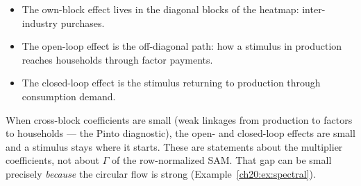 \documentclass[../structural_economics_book.tex]{subfiles}
\begin{document}
\begin{intuition}
\begin{itemize}
\item The own-block effect lives in the diagonal blocks of the heatmap: inter-industry purchases.
\item The open-loop effect is the off-diagonal path: how a stimulus in production reaches households through factor payments.
\item The closed-loop effect is the stimulus returning to production through consumption demand.
\end{itemize}
When cross-block coefficients are small (weak linkages from production to factors to households --- the Pinto diagnostic), the open- and closed-loop effects are small and a stimulus stays where it starts. These are statements about the multiplier coefficients, not about $\Gamma$ of the row-normalized SAM. That gap can be small precisely \emph{because} the circular flow is strong (Example~\ref{ch20:ex:spectral}).
\end{intuition}
\end{document}
